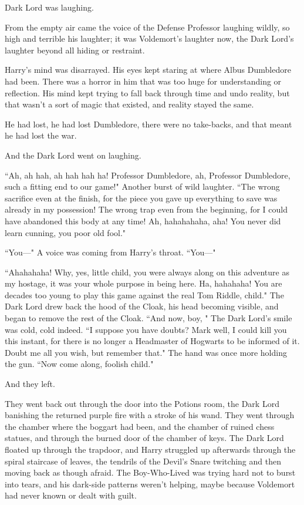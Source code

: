 
 Dark Lord was laughing.

\hplettrineextrapara
From the empty air came the voice of the Defense Professor laughing wildly, so high and terrible his laughter; it was Voldemort's laughter now, the Dark Lord's laughter beyond all hiding or restraint.

Harry's mind was disarrayed. His eyes kept staring at where Albus Dumbledore had been. There was a horror in him that was too huge for understanding or reflection. His mind kept trying to fall back through time and undo reality, but that wasn't a sort of magic that existed, and reality stayed the same.

He had lost, he had lost Dumbledore, there were no take-backs, and that meant he had lost the war.

And the Dark Lord went on laughing.

``Ah, ah hah, ah hah hah ha! Professor Dumbledore, ah, Professor Dumbledore, such a fitting end to our game!" Another burst of wild laughter. ``The wrong sacrifice even at the finish, for the piece you gave up everything to save was already in my possession! The wrong trap even from the beginning, for I could have abandoned this body at any time! Ah, hahahahaha, aha! You never did learn cunning, you poor old fool."

``You—" A voice was coming from Harry's throat. ``You—"

``Ahahahaha! Why, yes, little child, you were always along on this adventure as my hostage, it was your whole purpose in being here. Ha, hahahaha! You are decades too young to play this game against the real Tom Riddle, child." The Dark Lord drew back the hood of the Cloak, his head becoming visible, and began to remove the rest of the Cloak. ``And now, boy, " The Dark Lord's smile was cold, cold indeed. ``I suppose you have doubts? Mark well, I could kill you this instant, for there is no longer a Headmaster of Hogwarts to be informed of it. Doubt me all you wish, but remember that." The hand was once more holding the gun. ``Now come along, foolish child."

And they left.

They went back out through the door into the Potions room, the Dark Lord banishing the returned purple fire with a stroke of his wand. They went through the chamber where the boggart had been, and the chamber of ruined chess statues, and through the burned door of the chamber of keys. The Dark Lord floated up through the trapdoor, and Harry struggled up afterwards through the spiral staircase of leaves, the tendrils of the Devil's Snare twitching and then moving back as though afraid. The Boy-Who-Lived was trying hard not to burst into tears, and his dark-side patterns weren't helping, maybe because Voldemort had never known or dealt with guilt.

